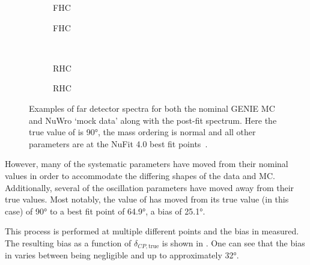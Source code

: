 \begin{figure}[h]
	\begin{subfigure}[t]{0.5\linewidth}
		\begin{adjustbox}{max totalsize=\linewidth, center}
			
		\end{adjustbox}	
		\caption{\numu FHC}	
	\end{subfigure}	
	\hfill
	\begin{subfigure}[t]{0.5\linewidth}
		\begin{adjustbox}{max totalsize=\linewidth, center}
			
		\end{adjustbox}	
		\caption{\nue FHC}	
	\end{subfigure} \\ 
	\begin{subfigure}[t]{0.5\linewidth}
		\begin{adjustbox}{max totalsize=\linewidth, center}
			
		\end{adjustbox}	
		\caption{\numu RHC}	
	\end{subfigure}	
	\hfill
	\begin{subfigure}[t]{0.5\linewidth}
		\begin{adjustbox}{max totalsize=\linewidth, center}
			
		\end{adjustbox}		
		\caption{\nue RHC}
	\end{subfigure}
	\caption[Examples of far detector spectra for both the nominal GENIE MC and NuWro `mock data' along with the post-fit spectrum]{Examples of far detector spectra for both the nominal GENIE MC and NuWro `mock data' along with the post-fit spectrum. Here the true value of \dcp is \ang{90}, the mass ordering is normal and all other parameters are at the NuFit 4.0 best fit points~\cite{nufit4}.}
	\label{fig:fdSamplesPostFit}
\end{figure}

However, many of the systematic parameters have moved from their nominal values in order to accommodate the differing shapes of the data and MC.
Additionally, several of the oscillation parameters have moved away from their true values.
Most notably, the value of \dcp has moved from its true value (in this case) of \ang{90} to a best fit point of \ang{64.9}, a bias of \ang{25.1}.

This process is performed at multiple different \dcp points and the bias in \dcp measured. 
The resulting bias as a function of $\delta_{CP, \text{true}}$ is shown in .
One can see that the bias in \dcp varies between being negligible and up to approximately \ang{32}. 

